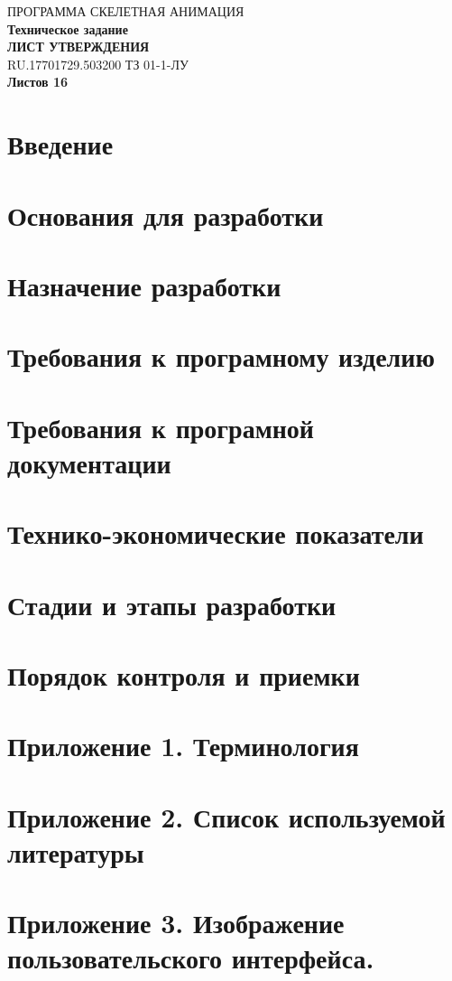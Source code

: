 \documentclass[twoside,a4paper,12pt]{article}
\begin{document}
\newpage
\vspace*{3cm}
\begin{center}
{ПРОГРАММА СКЕЛЕТНАЯ АНИМАЦИЯ} \\
\medskip
{\small\textbf{Техническое задание}} \\
\medskip
{\textbf{ЛИСТ УТВЕРЖДЕНИЯ} \\
\medskip
RU.17701729.503200 ТЗ 01-1-ЛУ} \\
\bigskip
\bigskip
\textbf{Листов 16}
\end{center}

\newpage

\tableofcontents
{}

\section{Введение}
%
\section{Основания для разработки}
\section{Назначение разработки}
\section{Требования к програмному изделию}
\section{Требования к програмной документации}
\section{Технико-экономические показатели}
\section{Стадии и этапы разработки}
\section{Порядок контроля и приемки}
\section{Приложение 1. Терминология}
\section{Приложение 2. Список используемой литературы}
\section{Приложение 3. Изображение пользовательского интерфейса.}

\newpage
{}
{}
\printindex
\end{document}

